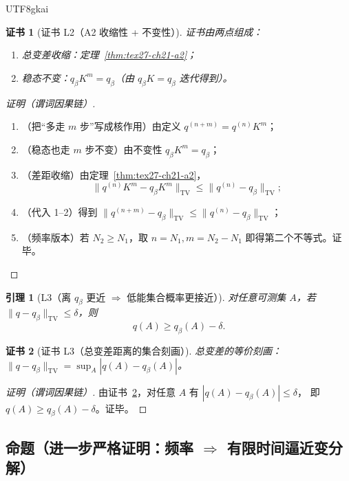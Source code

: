 \documentclass[12pt]{article}
\newtheorem{lemma}{引理}[section]
\newtheorem{Certificate}{证书}[section]
\begin{document}
\begin{CJK*}{UTF8}{gkai}
\begin{Certificate}[证书 L2（A2 收缩性 + 不变性）]
\label{cert:tex27-ch21-l2}
证书由两点组成：
\begin{enumerate}
  \item 总变差收缩：定理~\ref{thm:tex27-ch21-a2}；
  \item 稳态不变：$q_\beta K^m=q_\beta$（由 $q_\beta K=q_\beta$ 迭代得到）。
\end{enumerate}
\end{Certificate}

\begin{proof}[证明（谓词因果链）]
\begin{enumerate}
  \item（把“多走 $m$ 步”写成核作用）由定义 $q^{(n+m)}=q^{(n)}K^m$；
  \item（稳态也走 $m$ 步不变）由不变性 $q_\beta K^m=q_\beta$；
  \item（差距收缩）由定理~\ref{thm:tex27-ch21-a2}，
  \[
    \|q^{(n)}K^m-q_\beta K^m\|_{\mathrm{TV}}\le \|q^{(n)}-q_\beta\|_{\mathrm{TV}} ;
  \]
  \item（代入 1--2）得到 $\|q^{(n+m)}-q_\beta\|_{\mathrm{TV}}\le \|q^{(n)}-q_\beta\|_{\mathrm{TV}}$；
  \item（频率版本）若 $N_2\ge N_1$，取 $n=N_1,m=N_2-N_1$ 即得第二个不等式。证毕。
\end{enumerate}
\end{proof}

\begin{lemma}[L3（离 $q_\beta$ 更近 $\Rightarrow$ 低能集合概率更接近）]
\label{lem:tex27-ch21-l3}
对任意可测集 $A$，若 $\|q-q_\beta\|_{\mathrm{TV}}\le \delta$，则
\[
  q(A)\ge q_\beta(A)-\delta.
\]
\end{lemma}

\begin{Certificate}[证书 L3（总变差距离的集合刻画）]
\label{cert:tex27-ch21-l3}
总变差的等价刻画：$\|q-q_\beta\|_{\mathrm{TV}}=\sup_A |q(A)-q_\beta(A)|$。
\end{Certificate}

\begin{proof}[证明（谓词因果链）]
由证书~\ref{cert:tex27-ch21-l3}，对任意 $A$ 有 $|q(A)-q_\beta(A)|\le \delta$，
即 $q(A)\ge q_\beta(A)-\delta$。证毕。
\end{proof}

\subsection{命题（进一步严格证明：频率 $\Rightarrow$ 有限时间逼近变分解）}
\label{subsec:tex27-ch21-props}


\end{CJK*}
\end{document}
